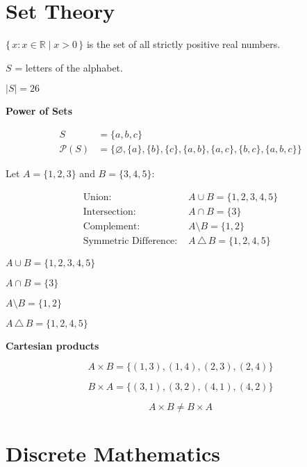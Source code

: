 \section{Set Theory}

\begin{multicols}{2}

$\{\, x : x \in \mathbb{R} \mid x > 0 \,\}$ is the set of all strictly positive real numbers.

$S$ = letters of the alphabet.

$|S| = 26$

\textbf{Power of Sets}

\begin{align*}
S &= \{a, b, c\} \\
\mathcal{P}(S) &= \{\varnothing, \{a\}, \{b\}, \{c\}, \{a,b\}, \{a,c\}, \{b,c\}, \{a,b,c\}\}
\end{align*}

Let $A = \{1, 2, 3\}$ and $B = \{3, 4, 5\}$:

\begin{align*}
    \text{Union: } & A \cup B = \{1, 2, 3, 4, 5\} \\
    \text{Intersection: } & A \cap B = \{3\} \\
    \text{Complement: } & A \setminus B = \{1, 2\} \\
    \text{Symmetric Difference: } & A \,\triangle\, B = \{1, 2, 4, 5\}
\end{align*}

\begin{description}[leftmargin=!,align=right,labelwidth=11em]
  \item[Union] $A \cup B = \{1, 2, 3, 4, 5\}$
  \item[Intersection] $A \cap B = \{3\}$
  \item[Complement] $A \setminus B = \{1, 2\}$
  \item[Symmetric Difference] $A \,\triangle\, B = \{1, 2, 4, 5\}$
\end{description}

\textbf{Cartesian products}

\[
A \times B = \{(1,3), (1,4), (2,3), (2,4)\}
\]

\[
B \times A = \{(3,1), (3,2), (4,1), (4,2)\}
\]

\[
A \times B \neq B \times A
\]

\end{multicols}

\newpage

\section{Discrete Mathematics}

